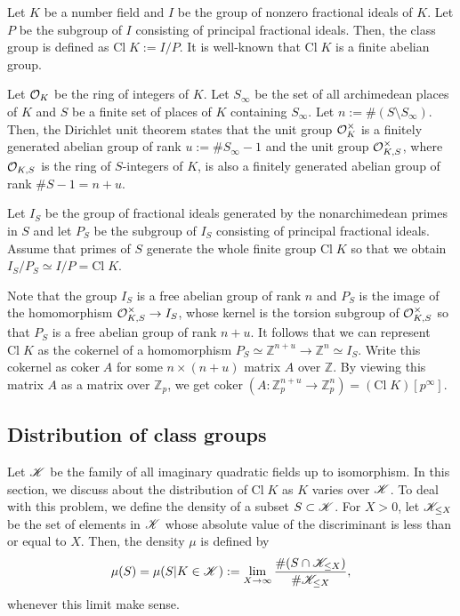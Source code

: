 \documentclass[12pt,reqno]{amsart}
\numberwithin{equation}{section}
\def\Z{{\mathbb Z}}
\begin{document}
Let $K$ be a number field and $I$ be the group of nonzero fractional ideals of $K$. Let $P$ be the subgroup of $I$ consisting of principal fractional ideals. Then, the class group is defined as $\text{Cl} \; K:=I/P$. It is well-known that $\text{Cl}\; K$ is a finite abelian group. 

Let ${\mathcal O}_K$ be the ring of integers of $K$. Let $S_\infty$ be the set of all archimedean places of $K$ and $S$ be a finite set of places of $K$ containing $S_\infty$. Let $n:= \#(S \setminus S_\infty)$. Then, the Dirichlet unit theorem states that the unit group ${\mathcal O}_K^\times$ is a finitely generated abelian group of rank $u:= \# S_\infty -1$ and the unit group ${\mathcal O}_{K,S}^\times$, where ${\mathcal O}_{K,S}$ is the ring of $S$-integers of $K$, is also a finitely generated abelian group of rank $\#S - 1 = n + u$. 

Let $I_S$ be the group of fractional ideals generated by the nonarchimedean primes in $S$ and let $P_S$ be the subgroup of $I_S$ consisting of principal fractional ideals. Assume that primes of $S$ generate the whole finite group $\text{Cl}\; K$ so that we obtain $I_S/P_S \simeq I/P = \text{Cl} \; K$.

Note that the group $I_S$ is a free abelian group of rank $n$ and $P_S$ is the image of the homomorphism ${\mathcal O}_{K,S}^\times \to I_S$, whose kernel is the torsion subgroup of ${\mathcal O}_{K,S}^\times$ so that $P_S$ is a free abelian group of rank $n+u$. It follows that we can represent $\text{Cl} \; K$ as the cokernel of a homomorphism $P_S \simeq \Z^{n+u} \to \Z^n \simeq I_S$. Write this cokernel as $\text{coker} \; A$ for some $n \times (n+u)$ matrix $A$ over $\Z$. By viewing this matrix $A$ as a matrix over $\Z_p$, we get $\text{coker} \; (A: \Z_p^{n+u} \to \Z_p^n) = (\text{Cl} \; K) [p^\infty]$.


\subsection{Distribution of class groups}

Let ${\mathscr K}$ be the family of all imaginary quadratic fields up to isomorphism. In this section, we discuss about the distribution of $\text{Cl} \; K$ as $K$ varies over ${\mathscr K}$. To deal with this problem, we define the density of a subset $S \subset {\mathscr K}$. For $X>0$, let ${\mathscr K}_{\le X}$ be the set of elements in ${\mathscr K}$ whose absolute value of the discriminant is less than or equal to $X$. Then, the density $\mu$ is defined by
\begin{align*}
\mu(S) = \mu(S | K \in {\mathscr K}) := \lim_{X \to \infty} \frac{\#(S \cap {\mathscr K}_{\le X})}{\# {\mathscr K}_{\le X}},
\end{align*}
whenever this limit make sense.
\end{document}
